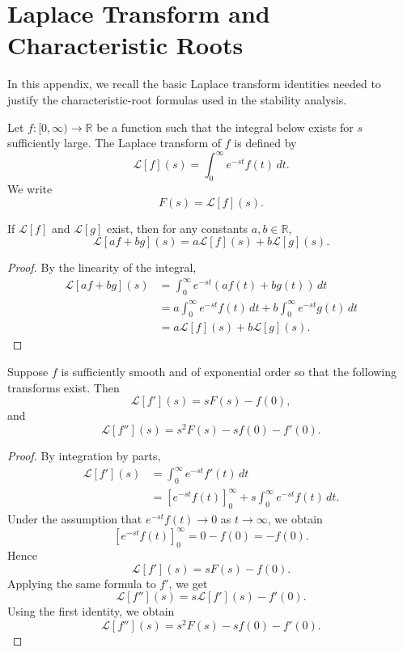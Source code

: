 ﻿\documentclass[12pt]{article}
\begin{document}
\section{Laplace Transform and Characteristic Roots}
\label{appendix:laplace-characteristic}

In this appendix, we recall the basic Laplace transform identities needed to justify the characteristic-root formulas used in the stability analysis.

\begin{definition}
Let $f:[0, \infty) \to \mathbb R$ be a function such that the integral below exists for $s$ sufficiently large. The Laplace transform of $f$ is defined by
\[
 \mathcal L[f](s)
 = \int_0^\infty e^{-st}f(t)\, dt.
\]
We write
\[
 F(s) = \mathcal L[f](s).
\]
\end{definition}

\begin{lemma}[Linearity]
If $\mathcal L[f]$ and $\mathcal L[g]$ exist, then for any constants $a, b \in \mathbb R$,
\[
 \mathcal L[af + bg](s)
 =
 a\mathcal L[f](s) + b\mathcal L[g](s).
\]
\end{lemma}

\begin{proof}
By the linearity of the integral,
\[
\begin{aligned}
 \mathcal L[af + bg](s)
 & = \int_0^\infty e^{-st}(af(t) + bg(t))\, dt\\
 & =
 a \int_0^\infty e^{-st}f(t)\, dt
 +
 b \int_0^\infty e^{-st}g(t)\, dt\\
 & =
 a\mathcal L[f](s) + b\mathcal L[g](s).
\end{aligned}
\]
\end{proof}

\begin{lemma}
Suppose $f$ is sufficiently smooth and of exponential order so that the following transforms exist. Then
\[
 \mathcal L[f'](s) = sF(s) - f(0),
\]
and
\[
 \mathcal L[f''](s) = s^2F(s) - sf(0) - f'(0).
\]
\end{lemma}

\begin{proof}
By integration by parts,
\[
\begin{aligned}
 \mathcal L[f'](s)
 & = \int_0^\infty e^{-st}f'(t)\, dt\\
 & =
 \left[e^{-st}f(t)\right]_0^\infty
 +
 s \int_0^\infty e^{-st}f(t)\, dt.
\end{aligned}
\]
Under the assumption that $e^{-st}f(t) \to 0$ as $t \to \infty$, we obtain
\[
 \left[e^{-st}f(t)\right]_0^\infty
 =
 0 - f(0)
 =
 -f(0).
\]
Hence
\[
 \mathcal L[f'](s) = sF(s) - f(0).
\]
Applying the same formula to $f'$, we get
\[
 \mathcal L[f''](s)
 =
 s\mathcal L[f'](s) - f'(0).
\]
Using the first identity, we obtain
\[
 \mathcal L[f''](s) = s^2F(s) - sf(0) - f'(0).
\]
\end{proof}
\end{document}
